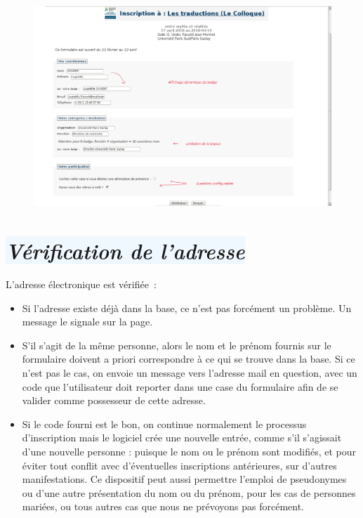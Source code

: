 \documentclass[10pt,a4paper]{article}
\newcommand{\bleupale}[1]{\colorbox{AliceBlue}{#1}}
\begin{document}
\begin{figure}[h]
  \includegraphics[width=500px]{images/formulaire-inscription-2}
\end{figure}

\newpage
\section*{\bleupale{\emph{Vérification de l'adresse}}}

L'adresse électronique est vérifiée :
\begin{itemize}
  \item Si l'adresse existe déjà dans la base, ce n'est pas forcément un problème. Un message le signale sur la page.
  \item S'il s'agit de la même personne, alors le nom et le prénom fournis sur le formulaire doivent a priori correspondre à ce qui se trouve dans la base. Si ce n'est pas le cas, on envoie un message vers l'adresse mail en question, avec un code que l'utilisateur doit reporter dans une case du formulaire afin de se valider comme possesseur de cette adresse.
  \item Si le code fourni est le bon, on continue normalement le processus d'inscription mais le logiciel crée une nouvelle entrée, comme s'il s'agissait d'une nouvelle personne : puisque le nom ou le prénom sont modifiés, et pour éviter tout conflit avec d'éventuelles inscriptions antérieures, sur d'autres manifestations. Ce dispositif peut aussi permettre l'emploi de pseudonymes ou d'une autre présentation du nom ou du prénom, pour les cas de personnes mariées, ou tous autres cas que nous ne prévoyons pas forcément.
  \end{itemize}
\end{document}
